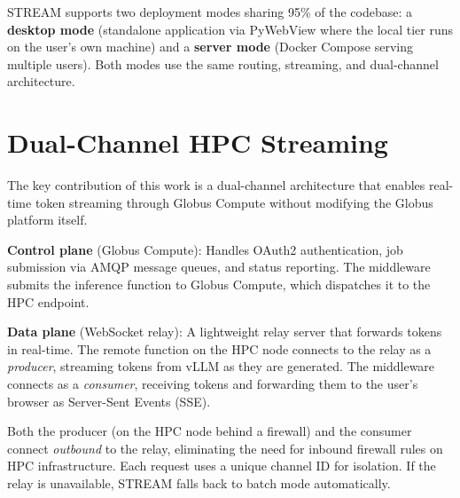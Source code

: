 \documentclass[manuscript, review]{acmart}
\begin{document}
STREAM supports two deployment modes sharing 95\% of the codebase: a \textbf{desktop mode} (standalone application via PyWebView where the local tier runs on the user's own machine) and a \textbf{server mode} (Docker Compose serving multiple users). Both modes use the same routing, streaming, and dual-channel architecture.


\section{Dual-Channel HPC Streaming}

The key contribution of this work is a dual-channel architecture that enables real-time token streaming through Globus Compute without modifying the Globus platform itself.

\textbf{Control plane} (Globus Compute): Handles OAuth2 authentication, job submission via AMQP message queues, and status reporting. The middleware submits the inference function to Globus Compute, which dispatches it to the HPC endpoint.

\textbf{Data plane} (WebSocket relay): A lightweight relay server that forwards tokens in real-time. The remote function on the HPC node connects to the relay as a \textit{producer}, streaming tokens from vLLM as they are generated. The middleware connects as a \textit{consumer}, receiving tokens and forwarding them to the user's browser as Server-Sent Events (SSE).


Both the producer (on the HPC node behind a firewall) and the consumer connect \textit{outbound} to the relay, eliminating the need for inbound firewall rules on HPC infrastructure. Each request uses a unique channel ID for isolation. If the relay is unavailable, STREAM falls back to batch mode automatically.

\end{document}

